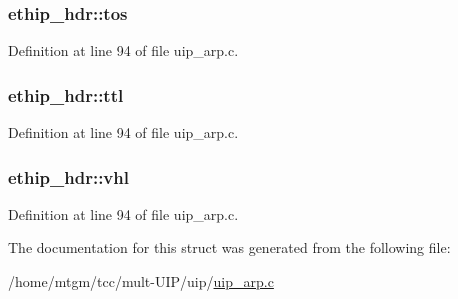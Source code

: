 \hypertarget{structethip__hdr_a26d6e202f33ab326f931b61347c9097a}{
\subsubsection[{tos}]{ {\bf ethip\_\-hdr::tos}}}
\label{structethip__hdr_a26d6e202f33ab326f931b61347c9097a}


Definition at line 94 of file uip\_\-arp.c.

\hypertarget{structethip__hdr_a1d197be2f56f3f065dd4ecdee58a5b02}{
\subsubsection[{ttl}]{ {\bf ethip\_\-hdr::ttl}}}
\label{structethip__hdr_a1d197be2f56f3f065dd4ecdee58a5b02}


Definition at line 94 of file uip\_\-arp.c.

\hypertarget{structethip__hdr_a790ec39bb30ced25b79b0178fd79e4e4}{
\subsubsection[{vhl}]{ {\bf ethip\_\-hdr::vhl}}}
\label{structethip__hdr_a790ec39bb30ced25b79b0178fd79e4e4}


Definition at line 94 of file uip\_\-arp.c.



The documentation for this struct was generated from the following file:\begin{DoxyCompactItemize}
\item 
/home/mtgm/tcc/mult-\/UIP/uip/\hyperlink{uip__arp_8c}{uip\_\-arp.c}\end{DoxyCompactItemize}

